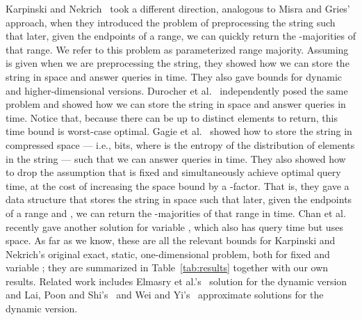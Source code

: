 \documentclass[prodmode,acmtalg]{acmsmall}
\begin{document}
Karpinski and Nekrich~\cite{KN08} took a different direction, analogous to Misra and Gries' approach, when they introduced the problem of preprocessing the string such that later, given the endpoints of a range, we can quickly return the -majorities of that range.  We refer to this problem as parameterized range majority.  Assuming  is given when we are preprocessing the string, they showed how we can store the string in  space and answer queries in  time.  They also gave bounds for dynamic and higher-dimensional versions.  Durocher et al.~\cite{DHMNS13} independently posed the same problem and showed how we can store the string in  space and answer queries in  time.  Notice that, because there can be up to  distinct elements to return, this time bound is worst-case optimal.  Gagie et al.~\cite{GHMN11} showed how to store the string in compressed space --- i.e.,  bits, where 
 is the entropy of the distribution of elements in the string --- such that we can answer queries in  time.  They also showed how to drop the assumption that  is fixed and simultaneously achieve optimal query time, at the cost of increasing the space bound by a -factor.  That is, they gave a data structure that stores the string in  space such that later, given the endpoints of a range and , we can return the -majorities of that range in  time.  Chan et al.~\cite{CDSW12} recently gave another solution for variable , which also has  query time but uses  space.  As far as we know, these are all the relevant bounds for Karpinski and Nekrich's original exact, static, one-dimensional problem, both for fixed and variable ; they are summarized in Table~\ref{tab:results} together with our own results.  Related work includes Elmasry et al.'s~\cite{EHMN11} solution for the dynamic 
version and Lai, Poon and Shi's~\cite{LPS08} and Wei and Yi's~\cite{WY11} approximate solutions for the dynamic version.
\end{document}
